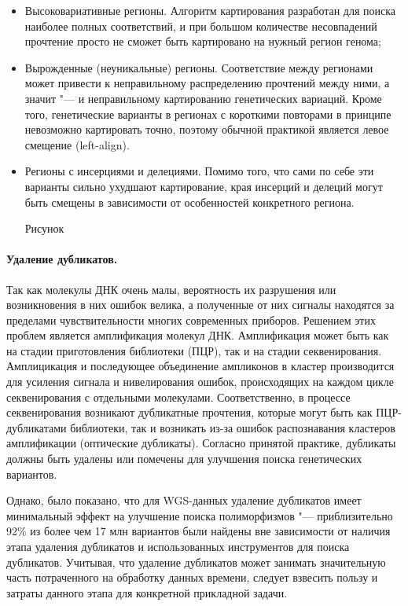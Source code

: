 \documentclass[a4paper,12pt]{article}
\begin{document}
\begin{itemize}
\item Высоковариативные регионы.
Алгоритм картирования разработан для поиска наиболее полных соответствий, и при большом количестве несовпадений прочтение просто не сможет быть картировано на нужный регион генома;
\item Вырожденные (неуникальные) регионы.
Соответствие между регионами может привести к неправильному распределению прочтений между ними, а значит "--- и неправильному картированию генетических вариаций.
Кроме того, генетические варианты в регионах с короткими повторами в принципе невозможно картировать точно, поэтому обычной практикой является левое смещение (left-align).
\item Регионы с инсерциями и делециями.
Помимо того, что сами по себе эти варианты сильно ухудшают картирование, края инсерций и делеций могут быть смещены в зависимости от особенностей конкретного региона.

\begin{Huge}Рисунок\end{Huge}
\end{itemize}

\paragraph{Удаление дубликатов.}
Так как молекулы ДНК очень малы, вероятность их разрушения или возникновения в них ошибок велика, а полученные от них сигналы находятся за пределами чувствительности многих современных приборов.
Решением этих проблем является амплификация молекул ДНК.
Амплификация может быть как на стадии приготовления библиотеки (ПЦР), так и на стадии секвенирования.
Амплицикация и последующее объединение ампликонов в кластер производится для усиления сигнала и нивелирования ошибок, происходящих на каждом цикле секвенирования с отдельными молекулами.
Соответственно, в процессе секвенирования возникают дубликатные прочтения, которые могут быть как ПЦР-дубликатами библиотеки, так и возникать из-за ошибок распознавания кластеров амплификации (оптические дубликаты).
Согласно принятой практике, дубликаты должны быть удалены или помечены для улучшения поиска генетических вариантов\cite{gatk}.

Однако, было показано, что для WGS-данных удаление дубликатов имеет минимальный эффект на улучшение поиска полиморфизмов "--- приблизительно 92\% из более чем 17 млн вариантов были найдены вне зависимости от наличия этапа удаления дубликатов и использованных инструментов для поиска дубликатов\cite{ebbert}.
Учитывая, что удаление дубликатов может занимать значительную часть потраченного на обработку данных времени, следует взвесить пользу и затраты данного этапа для конкретной прикладной задачи.
\end{document}

